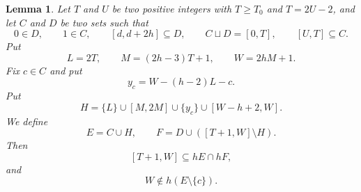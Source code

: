 \documentclass[10pt,a4paper]{amsart}
\newtheorem{lemma}{Lemma}
\begin{document}
\begin{lemma}\label{lem3}
Let $T$ and $U$ be two positive integers with $T\ge T_0$ and $T=2U-2$, and let $C$ and $D$ be two sets such that
\[
 0\in D,\qquad 1\in C,\qquad [d,d+2h]\subseteq D,\qquad C\sqcup D=[0,T],\qquad [U,T]\subseteq C.
\]
Put
\[
 L=2T,\qquad M=(2h-3)T+1,\qquad W=2hM+1.
\]
Fix $c\in C$ and put
\[
 y_c=W-(h-2)L-c.
\]
Put
\[
 H=\{L\}\cup[M,2M]\cup\{y_c\}\cup[W-h+2,W].
\]
We define
\[
 E=C\cup H,\qquad F=D\cup([T+1,W]\setminus H).
\]
Then
\begin{equation}\label{eq5}
[T+1,W]\subseteq hE\cap hF,
\end{equation}
and
\begin{equation}\label{eq6}
W\notin h(E\setminus\{c\}).
\end{equation}
\end{lemma}
\end{document}
